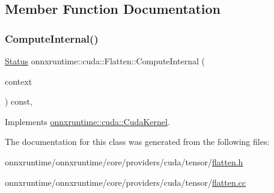 \subsection{Member Function Documentation}
\mbox{\label{classonnxruntime_1_1cuda_1_1Flatten_a823c3704fe7024e37a3c590c3adc3bf8}} 
\subsubsection{\texorpdfstring{Compute\+Internal()}{ComputeInternal()}}
{\footnotesize\ttfamily \mbox{\hyperlink{classonnxruntime_1_1common_1_1Status}{Status}} onnxruntime\+::cuda\+::\+Flatten\+::\+Compute\+Internal (\begin{DoxyParamCaption}\item[{\mbox{\hyperlink{classonnxruntime_1_1OpKernelContext}{Op\+Kernel\+Context}} $\ast$}]{context }\end{DoxyParamCaption}) const\hspace{0.3cm}{\ttfamily [override]}, {\ttfamily [virtual]}}



Implements \mbox{\hyperlink{classonnxruntime_1_1cuda_1_1CudaKernel_aca7af04ae448017d6023d30bba231ebb}{onnxruntime\+::cuda\+::\+Cuda\+Kernel}}.



The documentation for this class was generated from the following files\+:\begin{DoxyCompactItemize}
\item 
onnxruntime/onnxruntime/core/providers/cuda/tensor/\mbox{\hyperlink{cuda_2tensor_2flatten_8h}{flatten.\+h}}\item 
onnxruntime/onnxruntime/core/providers/cuda/tensor/\mbox{\hyperlink{cuda_2tensor_2flatten_8cc}{flatten.\+cc}}\end{DoxyCompactItemize}
